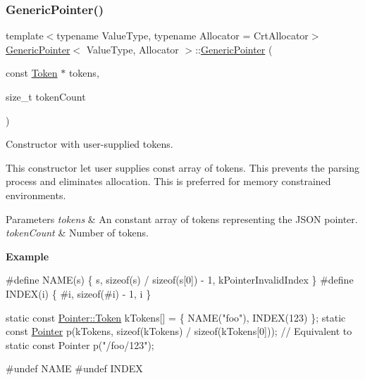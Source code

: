 \subsubsection{\texorpdfstring{Generic\+Pointer()}{GenericPointer()}\hspace{0.1cm}{\footnotesize\ttfamily [4/6]}}
{\footnotesize\ttfamily template$<$typename Value\+Type, typename Allocator = Crt\+Allocator$>$ \\
\hyperlink{classGenericPointer}{Generic\+Pointer}$<$ Value\+Type, Allocator $>$\+::\hyperlink{classGenericPointer}{Generic\+Pointer} (\begin{DoxyParamCaption}\item[{const \hyperlink{structGenericPointer_1_1Token}{Token} $\ast$}]{tokens,  }\item[{size\+\_\+t}]{token\+Count }\end{DoxyParamCaption})\hspace{0.3cm}{\ttfamily [inline]}}



Constructor with user-\/supplied tokens. 

This constructor let user supplies const array of tokens. This prevents the parsing process and eliminates allocation. This is preferred for memory constrained environments.


\begin{DoxyParams}{Parameters}
{\em tokens} & An constant array of tokens representing the J\+S\+ON pointer. \\
\hline
{\em token\+Count} & Number of tokens.\\
\hline
\end{DoxyParams}
{\bfseries Example} 
\begin{DoxyCode}
\textcolor{preprocessor}{#define NAME(s) \{ s, sizeof(s) / sizeof(s[0]) - 1, kPointerInvalidIndex \}}
\textcolor{preprocessor}{#define INDEX(i) \{ #i, sizeof(#i) - 1, i \}}

\textcolor{keyword}{static} \textcolor{keyword}{const} \hyperlink{structGenericPointer_1_1Token}{Pointer::Token} kTokens[] = \{ NAME(\textcolor{stringliteral}{"foo"}), INDEX(123) \};
\textcolor{keyword}{static} \textcolor{keyword}{const} \hyperlink{classGenericPointer}{Pointer} p(kTokens, \textcolor{keyword}{sizeof}(kTokens) / \textcolor{keyword}{sizeof}(kTokens[0]));
\textcolor{comment}{// Equivalent to static const Pointer p("/foo/123");}

\textcolor{preprocessor}{#undef NAME}
\textcolor{preprocessor}{#undef INDEX}
\end{DoxyCode}
 \mbox{\label{classGenericPointer_a7803645e8f7f349ee09c7d50351e9432}} 

